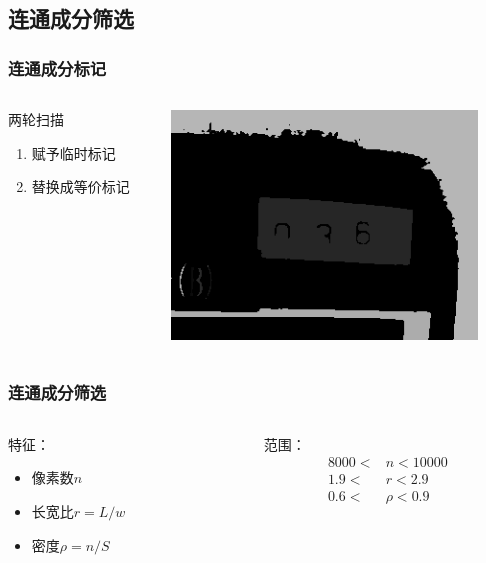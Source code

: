 \documentclass[12pt,hyperref={CJKbookmarks=true}]{beamer}
\begin{document}
\subsection{连通成分筛选}

\begin{frame}
  \frametitle{连通成分标记}
  \begin{columns}[onlytextwidth]
    \begin{column}{0.5\textwidth}
      两轮扫描
      \begin{enumerate}
      \item 赋予临时标记
      \item 替换成等价标记
      \end{enumerate}      
    \end{column}
    \begin{column}{0.5\textwidth}
      \centering
      \includegraphics[width=0.9\textwidth]{candidate.png}
    \end{column}
  \end{columns}
\end{frame}

\begin{frame}
  \frametitle{连通成分筛选}
  \begin{columns}[onlytextwidth]
    \begin{column}{0.5\textwidth}
      特征：
      \begin{itemize}
      \item 像素数$n$
      \item 长宽比$r=L/w$
      \item 密度$\rho=n/S$
      \end{itemize}
    \end{column}
    \begin{column}{0.5\textwidth}
      范围：
      \begin{equation*}
        \begin{aligned}
          8000 < &n < 10000 \\
          1.9 < &r < 2.9 \\
          0.6 < &\rho < 0.9
        \end{aligned}
      \end{equation*}
    \end{column}
  \end{columns}
\end{frame}
\end{document}
